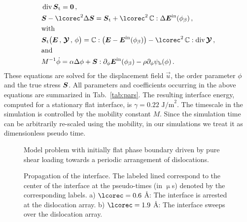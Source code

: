 \documentclass[preprint,review,3p,times,authoryear]{elsarticle}
\begin{document}
\begin{subequations}
  \begin{align}
    \label{eq:total_stress_S_ex}
    & \diver{\tSt} = \vec{0}\,,\\
    &\tS -\lcorec^{2}\Delta\tS = \tSt + \lcorec^{2}\,\bbC:\Delta\tEtr \,,\\
    & \text{with}\nonumber\\
    \label{eq:const_St_ex}
    &\tSt\bigl( \tE\,,\, \ttY\,,\, \phi \bigr) = \bbC:\left(  \tE-  \tEtr  \right) - \lcorec^{2}\, \bbC:\diver{ \ttY}\,,\\
    &\text{and}\nonumber\\
    \label{eq:AC_equation_explicit_ex}
    & M^{-1}\sdot\phi = \alpha\Delta\phi + \tS:\pder{\tEtr}{\phi}  - \rho\pder{\psi_{\ub}(\phi)}{\phi} \,.
  \end{align}
\end{subequations}
These equations are solved for the displacement field $\vec{u}$, the order parameter $\phi$ and the true stress $\boldsymbol{S}$. All parameters and coefficients occurring  in the above equations are summarized in Tab.~\ref{tab:pars}. The resulting interface energy, computed for a stationary flat interface, is $\gamma = 0.22 \text{ J/m}^2$. The timescale in the simulation is controlled by the mobility constant $M$. Since the simulation time can be arbitrarily re-scaled using the mobility, in our simulations we treat it as dimensionless pseudo time.

\begin{figure}[tbp]
  \centering
  \hspace{1cm}
  \caption{Model problem with initially flat phase boundary driven by pure shear loading towards a periodic arrangement of dislocations. }
  \label{fig:mm}
\end{figure}

\begin{figure}[tbp]
  \centering
  
  \caption{Propagation of the interface. The labeled lined correspond to the center of the interface at the pseudo-times (in $\upmu$s) denoted by the corresponding labels. a) $\lcorec = 0.6$ \AA: The interface is arrested at the dislocation array.  b) $\lcorec = 1.9$ \AA: The interface sweeps over the dislocation array.}
  \label{fig:mm_inter}
\end{figure}
\end{document}
